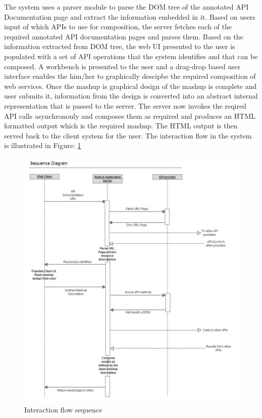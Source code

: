 \begin{spacing}{1.5}
The system uses a parser module to parse the DOM tree of the annotated API Documentation page and extract the information embedded in it. Based on users input of which APIs to use for composition, the server fetches each of the required annotated API documentation pages and parses them. Based on the information extracted from DOM tree, the web UI presented to the user is populated with a set of API operations that the system identifies and that can be composed. A workbench is presented to the user and a drag-drop based user interface enables the him/her to graphically descipbe the required composition of web services. Once the mashup is graphical design of the mashup is complete and user submits it, information from the design is converted into an abstract internal representation that is passed to the server. The server now invokes the reqired API calls asynchronouly and composes them as required and produces an HTML formatted output which is the required mashup. The HTML output is then served back to the client system for the user. The interaction flow in the system is illustrated in Figure: \ref{fig:sequence}

\begin{figure}
        \centering
        \includegraphics[scale=0.5]{images/smashup_sequence.jpg}
        \caption{Interaction flow sequence}
        \label{fig:sequence}
\end{figure}


\end{spacing}
